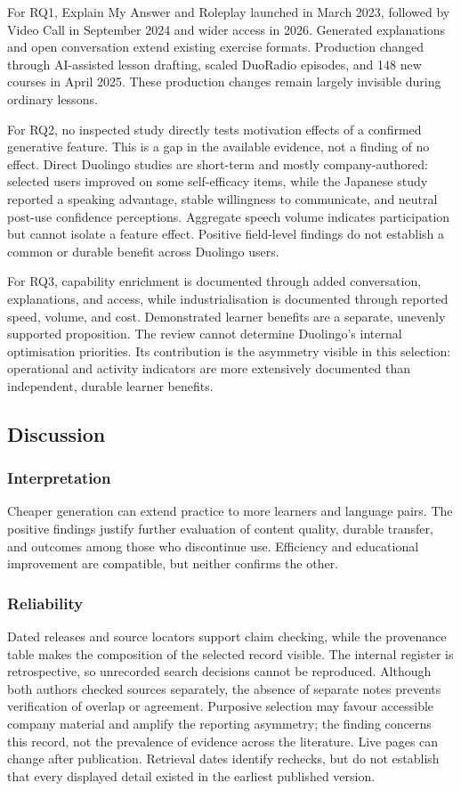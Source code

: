 \documentclass[11pt,titlepage]{article}
\begin{document}
For RQ1, Explain My Answer and Roleplay launched in March 2023, followed by Video Call in September 2024 and wider access in 2026. Generated explanations and open conversation extend existing exercise formats. Production changed through AI-assisted lesson drafting, scaled DuoRadio episodes, and 148 new courses in April 2025. These production changes remain largely invisible during ordinary lessons.

For RQ2, no inspected study directly tests motivation effects of a confirmed generative feature. This is a gap in the available evidence, not a finding of no effect. Direct Duolingo studies are short-term and mostly company-authored: selected users improved on some self-efficacy items, while the Japanese study reported a speaking advantage, stable willingness to communicate, and neutral post-use confidence perceptions. Aggregate speech volume indicates participation but cannot isolate a feature effect. Positive field-level findings do not establish a common or durable benefit across Duolingo users.

For RQ3, capability enrichment is documented through added conversation, explanations, and access, while industrialisation is documented through reported speed, volume, and cost. Demonstrated learner benefits are a separate, unevenly supported proposition. The review cannot determine Duolingo's internal optimisation priorities. Its contribution is the asymmetry visible in this selection: operational and activity indicators are more extensively documented than independent, durable learner benefits.

\subsection{Discussion}
\subsubsection{Interpretation}
Cheaper generation can extend practice to more learners and language pairs. The positive findings justify further evaluation of content quality, durable transfer, and outcomes among those who discontinue use. Efficiency and educational improvement are compatible, but neither confirms the other.

\subsubsection{Reliability}
Dated releases and source locators support claim checking, while the provenance table makes the composition of the selected record visible. The internal register is retrospective, so unrecorded search decisions cannot be reproduced. Although both authors checked sources separately, the absence of separate notes prevents verification of overlap or agreement. Purposive selection may favour accessible company material and amplify the reporting asymmetry; the finding concerns this record, not the prevalence of evidence across the literature. Live pages can change after publication. Retrieval dates identify rechecks, but do not establish that every displayed detail existed in the earliest published version.
\end{document}
